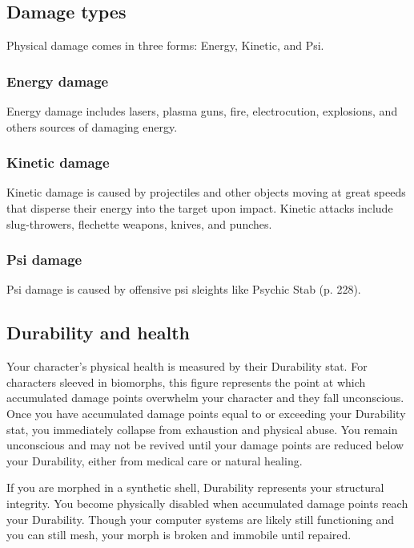 \subsection{Damage types}
\label{sec:damage-types}

Physical damage comes in three forms: Energy, Kinetic, and Psi.

\subsubsection{Energy damage}

Energy damage includes lasers, plasma guns, fire, electrocution, explosions, and others sources of damaging energy.

\subsubsection{Kinetic damage}

Kinetic damage is caused by projectiles and other objects moving at great speeds that disperse their energy into the target upon impact. Kinetic attacks include slug-throwers, flechette weapons, knives, and punches.

\subsubsection{Psi damage}

Psi damage is caused by offensive psi sleights like Psychic Stab (p. 228).


\subsection{Durability and health}
\label{sec:durability-health}

Your character’s physical health is measured by their Durability stat. For characters sleeved in biomorphs, this figure represents the point at which accumulated damage points overwhelm your character and they fall unconscious. Once you have accumulated damage points equal to or exceeding your Durability stat, you immediately collapse from exhaustion and physical abuse. You remain unconscious and may not be revived until your damage points are reduced below your Durability, either from medical care or natural healing.

If you are morphed in a synthetic shell, Durability represents your structural integrity. You become physically disabled when accumulated damage points reach your Durability. Though your computer systems are likely still functioning and you can still mesh, your morph is broken and immobile until repaired.


